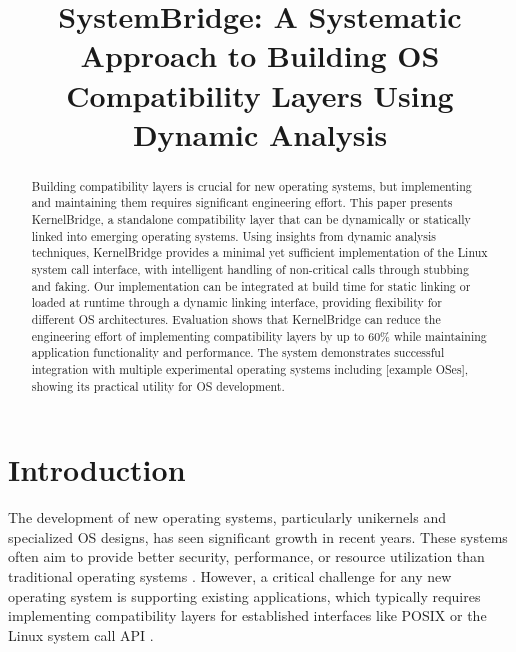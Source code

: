 \documentclass[conference]{IEEEtran}
\begin{document}
\title{SystemBridge: A Systematic Approach to Building OS Compatibility Layers Using Dynamic Analysis}

\author{
	}

\maketitle

\begin{abstract}
	Building compatibility layers is crucial for new operating systems, but implementing and maintaining them requires significant engineering effort. This paper presents KernelBridge, a standalone compatibility layer that can be dynamically or statically linked into emerging operating systems. Using insights from dynamic analysis techniques, KernelBridge provides a minimal yet sufficient implementation of the Linux system call interface, with intelligent handling of non-critical calls through stubbing and faking. Our implementation can be integrated at build time for static linking or loaded at runtime through a dynamic linking interface, providing flexibility for different OS architectures. Evaluation shows that KernelBridge can reduce the engineering effort of implementing compatibility layers by up to 60\% while maintaining application functionality and performance. The system demonstrates successful integration with multiple experimental operating systems including [example OSes], showing its practical utility for OS development.
\end{abstract}

\section{Introduction}
The development of new operating systems, particularly unikernels and specialized OS designs, has seen significant growth in recent years. These systems often aim to provide better security, performance, or resource utilization than traditional operating systems \cite{madhavapeddy2015unikernels}. However, a critical challenge for any new operating system is supporting existing applications, which typically requires implementing compatibility layers for established interfaces like POSIX or the Linux system call API \cite{linux_kernel_clothing}.
\end{document}
